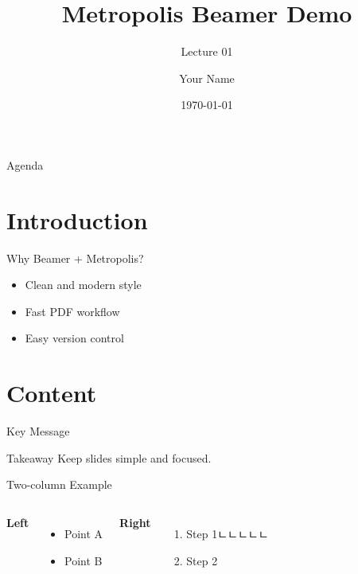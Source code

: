 \documentclass[10pt,aspectratio=169]{beamer}
\title{Metropolis Beamer Demo}
\subtitle{Lecture 01}
\author{Your Name}
\institute{Your Organization}
\date{\today}
\begin{document}
\maketitle

\begin{frame}{Agenda}
  \tableofcontents
\end{frame}

\section{Introduction}
\begin{frame}{Why Beamer + Metropolis?}
  \begin{itemize}
    \item Clean and modern style
    \item Fast PDF workflow
    \item Easy version control
  \end{itemize}
\end{frame}

\section{Content}
\begin{frame}{Key Message}
  \begin{block}{Takeaway}
    Keep slides simple and focused.
  \end{block}
\end{frame}

\begin{frame}{Two-column Example}
  \begin{columns}[T,onlytextwidth]
      \textbf{Left}
      \begin{itemize}
        \item Point A
        \item Point B
      \end{itemize}
      \textbf{Right}
      \begin{enumerate}
        \item Step 1ㄴㄴㄴㄴㄴ
        \item Step 2
      \end{enumerate}
  \end{columns}
\end{frame}
\end{document}
